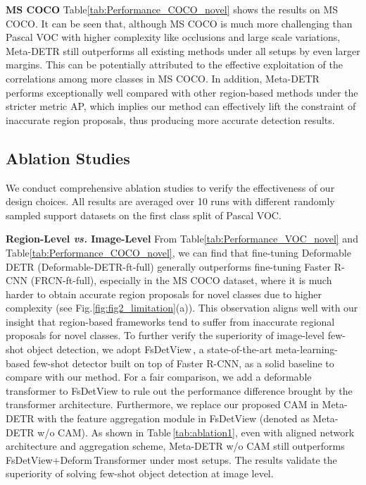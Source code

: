 \documentclass[letterpaper]{article} \usepackage{aaai22}  \usepackage{times}  \usepackage{helvet}  \usepackage{courier}  \usepackage[hyphens]{url}  \usepackage{graphicx} \urlstyle{rm} \def\UrlFont{\rm}  \usepackage{natbib}  \usepackage{caption} \DeclareCaptionStyle{ruled}{labelfont=normalfont,labelsep=colon,strut=off} \frenchspacing  \setlength{\pdfpagewidth}{8.5in}  \setlength{\pdfpageheight}{11in}  \usepackage{algorithm}
\begin{document}
\vspace{+0.5mm}
\smallskip
\noindent\textbf{MS COCO \;\;}
Table\;\ref{tab:Performance_COCO_novel} shows the results on MS COCO. It can be seen that, although MS COCO is much more challenging than Pascal VOC with higher complexity like occlusions and large scale variations, Meta-DETR still outperforms all existing methods under all setups by even larger margins. This can be potentially attributed to the effective exploitation of the correlations among more classes in MS COCO. In addition, Meta-DETR performs exceptionally well compared with other region-based methods under the stricter metric AP, which implies our method can effectively lift the constraint of inaccurate region proposals, thus producing more accurate detection results.



\subsection{Ablation Studies}

We conduct comprehensive ablation studies to verify the effectiveness of our design choices. All results are averaged over 10 runs with different randomly sampled support datasets on the first class split of Pascal VOC.

\vspace{+0.5mm}
\smallskip
\noindent\textbf{Region-Level \textit{vs.} Image-Level \;\;}
From Table\;\ref{tab:Performance_VOC_novel} and Table\;\ref{tab:Performance_COCO_novel}, we can find that fine-tuning Deformable DETR (Deformable-DETR-ft-full) generally outperforms fine-tuning Faster R-CNN (FRCN-ft-full), especially in the MS COCO dataset, where it is much harder to obtain accurate region proposals for novel classes due to higher complexity (see Fig.\;\ref{fig:fig2_limitation}(a)). This observation aligns well with our insight that region-based frameworks tend to suffer from inaccurate regional proposals for novel classes. To further verify the superiority of image-level few-shot object detection, we adopt FsDetView\,\cite{FSDetView}, a state-of-the-art meta-learning-based few-shot detector built on top of Faster R-CNN, as a solid baseline to compare with our method. For a fair comparison, we add a deformable transformer to FsDetView to rule out the performance difference brought by the transformer architecture. Furthermore, we replace our proposed CAM in Meta-DETR with the feature aggregation module in FsDetView (denoted as Meta-DETR w/o CAM). As shown in Table\,\ref{tab:ablation1}, even with aligned network architecture and aggregation scheme, Meta-DETR w/o CAM still outperforms FsDetView\;+\;Deform\,Transformer under most setups. The results validate the superiority of solving few-shot object detection at image level.
\end{document}
